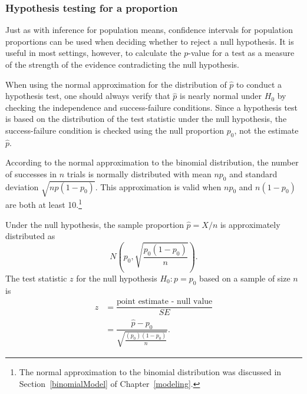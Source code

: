 \subsubsection{Hypothesis testing for a proportion}
\label{htForPropSection}

Just as with inference for population means, confidence intervals for population proportions can be used when deciding whether to reject a null hypothesis. It is useful in most settings, however, to calculate the $p$-value for a test as a measure of the strength of the evidence contradicting the null hypothesis.

When using the normal approximation for the distribution of $\hat{p}$ to conduct a hypothesis test, one should always verify that $\hat{p}$ is nearly normal under $H_0$ by checking the independence and success-failure conditions. Since a hypothesis test is based on the distribution of the test statistic under the null hypothesis, the success-failure condition is checked using the null proportion $p_0$, not the estimate $\hat{p}$. 

According to the normal approximation to the binomial distribution, the number of successes in $n$ trials is normally distributed with mean $np_0$ and standard deviation $\sqrt{np(1-p_0)}$. This approximation is valid when $np_0$ and $n(1-p_0)$ are both at least 10.\footnote{The normal approximation to the binomial distribution was discussed in Section~\ref{binomialModel} of Chapter~\ref{modeling}.} 

\textD{\newpage}

Under the null hypothesis, the sample proportion $\hat{p} = X/n$ is approximately distributed as 
\[N \left(p_0, \sqrt{\frac{p_0(1-p_0)}{n}} \right).\]
The test statistic $z$ for the null hypothesis $H_0: p = p_0$ based on a sample of size $n$ is 
\begin{align*}
  z &= \dfrac{\text{point estimate - null value}}{SE} \\
    &= \dfrac{\hat{p} - p_0}{\sqrt{\frac{(p_0)(1-p_0)}{n}}}. 
\end{align*}

